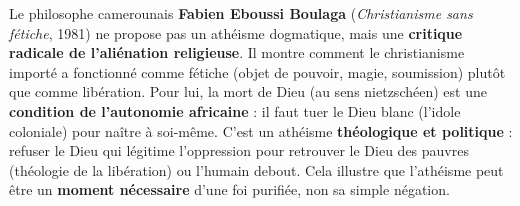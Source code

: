 \documentclass[11pt]{article}
\begin{document}
\begin{exemplebox}
Le philosophe camerounais \textbf{Fabien Eboussi Boulaga} (\emph{Christianisme sans fétiche}, 1981) ne propose pas un athéisme dogmatique, mais une \textbf{critique radicale de l'aliénation religieuse}. Il montre comment le christianisme importé a fonctionné comme \guillemotleft fétiche \guillemotright (objet de pouvoir, magie, soumission) plutôt que comme libération. Pour lui, \guillemotleft la mort de Dieu \guillemotright (au sens nietzschéen) est une \textbf{condition de l'autonomie africaine} : il faut \guillemotleft tuer le Dieu blanc \guillemotright (l'idole coloniale) pour naître à soi-même. C'est un athéisme \textbf{théologique et politique} : refuser le Dieu qui légitime l'oppression pour retrouver le \guillemotleft Dieu des pauvres \guillemotright (théologie de la libération) ou l'humain debout. Cela illustre que l'athéisme peut être un \textbf{moment nécessaire} d'une foi purifiée, non sa simple négation.
\end{exemplebox}
\end{document}
